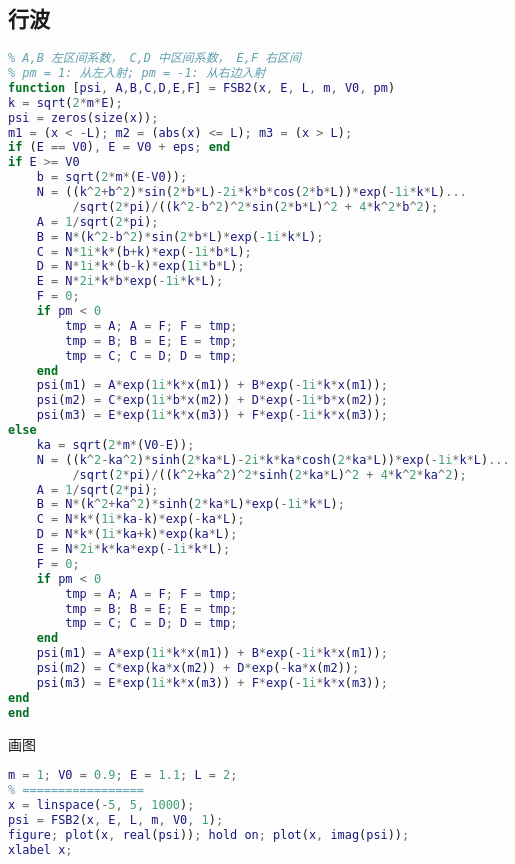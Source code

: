 \subsection{行波}

\begin{lstlisting}[language=matlab, caption=FSB2.m]
% m 质量，V0 势垒，E 能量， L 势垒半宽， odd 奇函数 true 偶函数 false
% A,B 左区间系数， C,D 中区间系数， E,F 右区间
% pm = 1: 从左入射; pm = -1: 从右边入射
function [psi, A,B,C,D,E,F] = FSB2(x, E, L, m, V0, pm)
k = sqrt(2*m*E);
psi = zeros(size(x));
m1 = (x < -L); m2 = (abs(x) <= L); m3 = (x > L);
if (E == V0), E = V0 + eps; end
if E >= V0
    b = sqrt(2*m*(E-V0));
    N = ((k^2+b^2)*sin(2*b*L)-2i*k*b*cos(2*b*L))*exp(-1i*k*L)...
         /sqrt(2*pi)/((k^2-b^2)^2*sin(2*b*L)^2 + 4*k^2*b^2);
    A = 1/sqrt(2*pi);
    B = N*(k^2-b^2)*sin(2*b*L)*exp(-1i*k*L);
    C = N*1i*k*(b+k)*exp(-1i*b*L);
    D = N*1i*k*(b-k)*exp(1i*b*L);
    E = N*2i*k*b*exp(-1i*k*L);
    F = 0;
    if pm < 0
        tmp = A; A = F; F = tmp;
        tmp = B; B = E; E = tmp;
        tmp = C; C = D; D = tmp;
    end
    psi(m1) = A*exp(1i*k*x(m1)) + B*exp(-1i*k*x(m1));
    psi(m2) = C*exp(1i*b*x(m2)) + D*exp(-1i*b*x(m2));
    psi(m3) = E*exp(1i*k*x(m3)) + F*exp(-1i*k*x(m3));
else
    ka = sqrt(2*m*(V0-E));
    N = ((k^2-ka^2)*sinh(2*ka*L)-2i*k*ka*cosh(2*ka*L))*exp(-1i*k*L)...
         /sqrt(2*pi)/((k^2+ka^2)^2*sinh(2*ka*L)^2 + 4*k^2*ka^2);
    A = 1/sqrt(2*pi);
    B = N*(k^2+ka^2)*sinh(2*ka*L)*exp(-1i*k*L);
    C = N*k*(1i*ka-k)*exp(-ka*L);
    D = N*k*(1i*ka+k)*exp(ka*L);
    E = N*2i*k*ka*exp(-1i*k*L);
    F = 0;
    if pm < 0
        tmp = A; A = F; F = tmp;
        tmp = B; B = E; E = tmp;
        tmp = C; C = D; D = tmp;
    end
    psi(m1) = A*exp(1i*k*x(m1)) + B*exp(-1i*k*x(m1));
    psi(m2) = C*exp(ka*x(m2)) + D*exp(-ka*x(m2));
    psi(m3) = E*exp(1i*k*x(m3)) + F*exp(-1i*k*x(m3));
end
end
\end{lstlisting}

画图
\begin{lstlisting}[language=matlab]
% === 设置参数 =====
m = 1; V0 = 0.9; E = 1.1; L = 2;
% =================
x = linspace(-5, 5, 1000);
psi = FSB2(x, E, L, m, V0, 1);
figure; plot(x, real(psi)); hold on; plot(x, imag(psi));
xlabel x;
\end{lstlisting}
